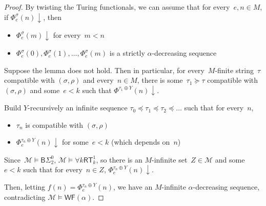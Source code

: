 \documentclass{article}
\numberwithin{theorem}{section}
\newcommand{\BSig}{\mathsf{B}\Sigma^0}
\newcommand{\WF}{\mathsf{WF}}
\newcommand{\RT}{\mathsf{RT}}
\newcommand{\M}{\mathcal{M}}
\begin{document}
\begin{proof}
By twisting the Turing functionals, we can assume that for every~$e, n \in M$, if $\Phi^\sigma_e(n)\downarrow$, then
\begin{itemize}
    \item $\Phi^\sigma_e(m)\downarrow$ for every~$m < n$
    \item $\Phi^\sigma_e(0), \Phi^\sigma_e(1), \dots, \Phi^\sigma_e(m)$ is a strictly $\alpha$-decreasing sequence
\end{itemize}

Suppose the lemma does not hold. Then in particular, for every~$M$-finite string~$\tau$ compatible with $(\sigma, \rho)$ and every~$n \in M$, there is some~$\tau_1 \succeq \tau$ compatible with~$(\sigma, \rho)$ and some~$e < k$ such that $\Phi^{\tau_1 \oplus Y}(n)\downarrow$.

Build $Y$-recursively an infinite sequence $\tau_0 \preceq \tau_1 \preceq \tau_2 \preceq \dots$ such that for every~$n$,
\begin{itemize}
    \item $\tau_n$ is compatible with $(\sigma, \rho)$
    \item $\Phi^{\tau_n \oplus Y}_e(n)\downarrow$ for some~$e < k$ (which depends on~$n$)
\end{itemize}
Since~$\M \models \BSig_2$, $\M \models \forall k\RT^1_k$,
so there is an $M$-infinite set~$Z \in \M$ and some~$e < k$ such that for every~$n \in Z$, $\Phi^{\tau_n \oplus Y}_e(n)\downarrow$.

Then, letting $f(n) = \Phi^{\tau_n \oplus Y}_e(n)$, we have an $M$-infinite $\alpha$-decreasing sequence, contradicting $\M \models \WF(\alpha)$.
\end{proof}
\end{document}
